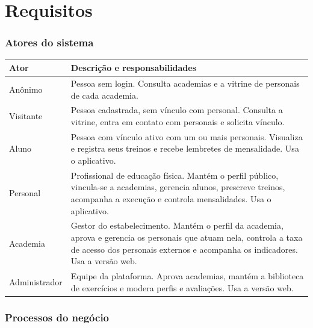 \part{Requisitos}

\section{Atores do sistema}

\begin{tabularx}{\textwidth}{@{}l L@{}}
  \toprule
  \textbf{Ator} & \textbf{Descrição e responsabilidades} \\
  \midrule
  Anônimo       & Pessoa sem login. Consulta academias e a vitrine de personais de cada academia. \\
  Visitante     & Pessoa cadastrada, sem vínculo com personal. Consulta a vitrine, entra em contato com personais e solicita vínculo. \\
  Aluno         & Pessoa com vínculo ativo com um ou mais personais. Visualiza e registra seus treinos e recebe lembretes de mensalidade. Usa o aplicativo. \\
  Personal      & Profissional de educação física. Mantém o perfil público, vincula-se a academias, gerencia alunos, prescreve treinos, acompanha a execução e controla mensalidades. Usa o aplicativo. \\
  Academia      & Gestor do estabelecimento. Mantém o perfil da academia, aprova e gerencia os personais que atuam nela, controla a taxa de acesso dos personais externos e acompanha os indicadores. Usa a versão web. \\
  Administrador & Equipe da plataforma. Aprova academias, mantém a biblioteca de exercícios e modera perfis e avaliações. Usa a versão web. \\
  \bottomrule
\end{tabularx}

\section{Processos do negócio}


